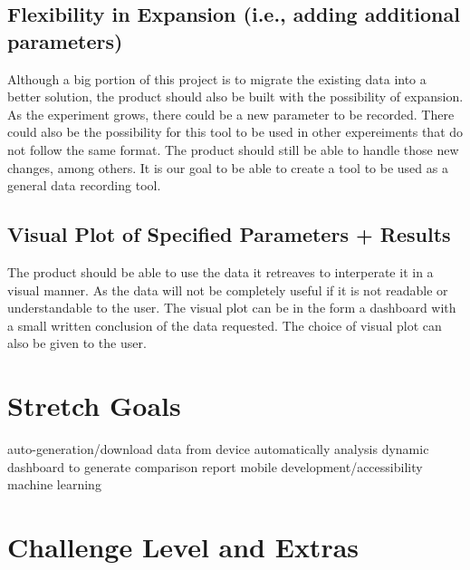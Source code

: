 \documentclass{article}
\begin{document}
\subsection*{Flexibility in Expansion (i.e., adding additional parameters)}
Although a big portion of this project is to migrate the existing data into a better solution, the product should also be 
built with the possibility of expansion. As the experiment grows, there could be a new parameter to be recorded. 
There could also be the possibility for this tool to be used in other expereiments that do not follow the same format. The product should still be able to handle those new changes, among others. 
It is our goal to be able to create a tool to be used as a general data recording tool. 

\subsection*{Visual Plot of Specified Parameters + Results}
The product should be able to use the data it retreaves to interperate it in a visual manner. 
As the data will not be completely useful if it is not readable or understandable to the user. 
The visual plot can be in the form a dashboard with a small written conclusion of the data requested. 
The choice of visual plot can also be given to the user. 

\section{Stretch Goals}

auto-generation/download data from device automatically
analysis
dynamic dashboard to generate comparison report
mobile development/accessibility
machine learning


\section{Challenge Level and Extras}

\end{document}

